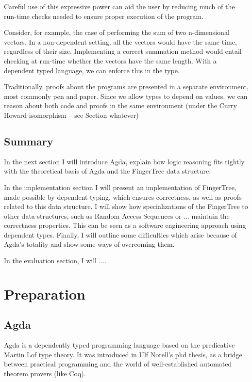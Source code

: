 \documentclass[12pt,twoside,notitlepage]{report}
\begin{document}
Careful use of this expressive power can aid the user by reducing much of the run-time checks needed to ensure proper execution of the program. 

Consider, for example, the case of performing the sum of two n-dimensional vectors. In a non-dependent setting, all the vectors would have the same time, regardless of their size. Implementing a correct summation method would entail checking at run-time whether the vectors have the same length. With a dependent typed language, we can enforce this in the type.

Traditionally, proofs about the programs are presented in a separate environment, most commonly pen and paper. Since we allow types to depend on values, we can reason about both code and proofs in the same environment (under the Curry Howard isomorphism – see Section whatever)


\section{Summary}

In the next section I will introduce Agda, explain how logic reasoning fits tightly with the theoretical basis of Agda and the FingerTree data structure. 

In the implementation section I will present an implementation of FingerTree, made possible by dependent typing, which ensures correctness, as well as proofs related to this data structure. 
I will show how specializations of the FingerTree to other data-structures, such as Random Access Sequences or ... maintain the correctness properties. This can be seen as a software engineering approach using dependent types. 
Finally, I will outline some difficulties which arise because of Agda’s totality and show some ways of overcoming them.

In the evaluation section, I will ....
 
\chapter{Preparation}

\section{Agda}

Agda is a dependently typed programming language based on the predicative Martin Lof type theory. It was introduced in Ulf Norell’s phd thesis, as a bridge between practical programming and the world of well-established automated theorem provers (like Coq). 
\end{document}
